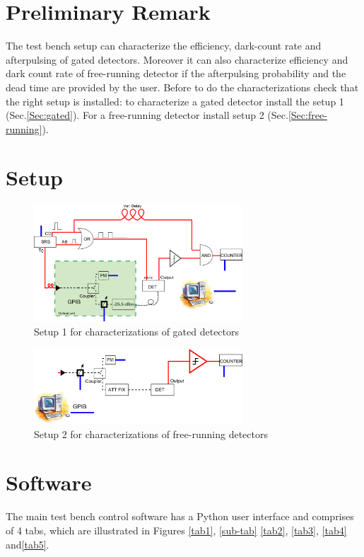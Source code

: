 \documentclass{article}
\begin{document}
\section{Preliminary Remark}
The test bench setup can characterize the efficiency, dark-count rate and afterpulsing of gated detectors. Moreover it can also characterize efficiency and dark count rate of free-running detector if the afterpulsing probability and the dead time are provided by the user.
Before to do the characterizations check that the right setup is installed: to characterize a gated detector install the setup 1 (Sec.\ref{Sec:gated}). For a free-running detector install setup 2 (Sec.\ref{Sec:free-running}).
\section{Setup}

\begin{figure}[htbp]
\centering
\includegraphics[width=7.8cm]{images/SetupGated2.png}
\caption{Setup 1 for characterizations of gated detectors}
\label{fig:gatedsetup1}
\end{figure}
\begin{figure}[htbp]
\centering
\includegraphics[width=7.8cm]{images/SetupFree_Running.png}
\caption{Setup 2 for characterizations of free-running detectors}
\label{fig:frdsetup2}
\end{figure}
  





\newpage
\section{Software}

The main test bench control software has a Python user interface and comprises of 4 tabs, which are illustrated in Figures \ref{tab1}, \ref{sub-tab} \ref{tab2}, \ref{tab3}, \ref{tab4} and\ref{tab5}. 
\end{document}
